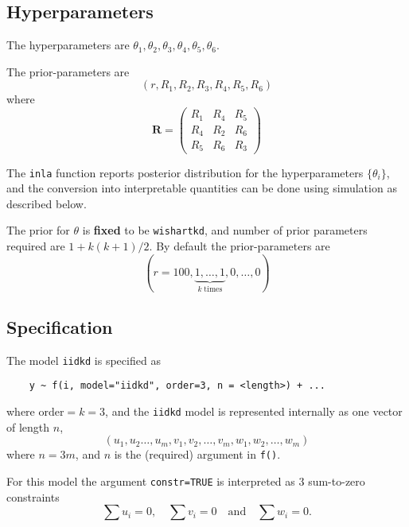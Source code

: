 \documentclass[a4paper,11pt]{article}
\begin{document}
\subsection*{Hyperparameters}

The hyperparameters are
$\theta_1, \theta_2, \theta_3, \theta_4, \theta_5, \theta_6$.

The prior-parameters are
\begin{displaymath}
    (r,R_{1}, R_{2}, R_{3}, R_{4}, R_{5}, R_{6})
\end{displaymath}
where 
\begin{displaymath}
    \mathbf{R}= \left(
      \begin{array}{ccc}
        R_{1} & R_{4} & R_{5}\\
        R_{4} & R_{2} & R_{6} \\
        R_{5} & R_{6} & R_{3}
      \end{array}\right)
\end{displaymath}

The {\tt inla} function reports posterior distribution for the
hyperparameters $\{\theta_i\}$, and the conversion into interpretable
quantities can be done using simulation as described below.

The prior for $\theta$ is {\bf fixed} to be {\tt wishartkd}, and
number of prior parameters required are $1 + k(k+1)/2$. By default the
prior-parameters are
\begin{displaymath}
    (r=100, \underbrace{1, \ldots, 1}_{k\;\text{times}}, 0, \ldots, 0)
\end{displaymath}


\subsection*{Specification}

The model \texttt{iidkd}
is specified as
\begin{verbatim}
    y ~ f(i, model="iidkd", order=3, n = <length>) + ...
\end{verbatim}
where $\text{order}=k=3$, and the \texttt{iidkd} model is represented
internally as one vector of length $n$,
\begin{displaymath}
    (u_{1}, u_{2} \ldots, u_{m}, v_{1}, v_{2}, \ldots, v_{m}, w_{1},
    w_{2}, \ldots, w_{m})
\end{displaymath}
where $n = 3m$, and $n$ is the (required) argument in
\texttt{f()}.

For this model the argument \texttt{constr=TRUE} is interpreted as $3$
sum-to-zero constraints
\begin{displaymath}
    \sum u_{i} = 0, \quad \sum v_{i} = 0 \quad\text{and}\quad \sum w_{i} = 0.
\end{displaymath}
\end{document}
